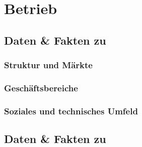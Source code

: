 
\chapter{Betrieb}

\section{Daten \& Fakten zu \firma} 

\subsection{Struktur und Märkte}

\subsection{Geschäftsbereiche}

\subsection{Soziales und technisches Umfeld}

\section{Daten \& Fakten zu \abteilung}

